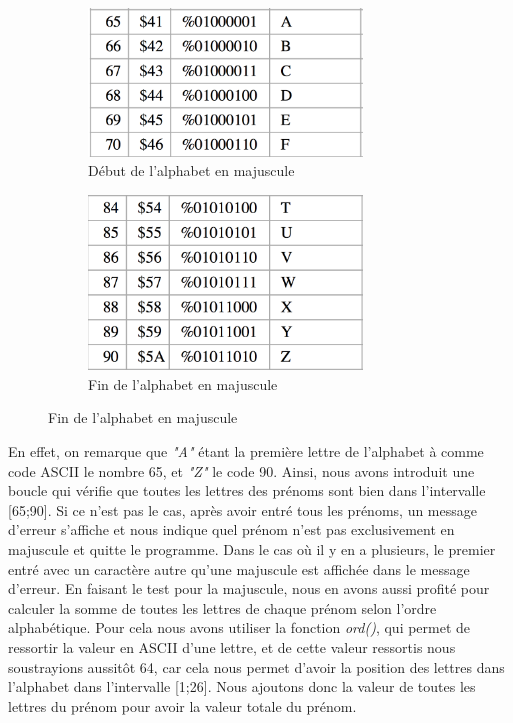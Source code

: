 \documentclass[13pt]{article}
\begin{document}
\begin{figure}[H]
\centering
\begin{subfigure}[H]{.5\textwidth}
  \centering
  \includegraphics[width=0.8\textwidth]{A.png}
  \caption{Début de l'alphabet en majuscule}
\end{subfigure}%
\begin{subfigure}[H]{.5\textwidth}
  \centering
  \includegraphics[width=0.8\textwidth]{Z.png}
  \caption{Fin de l'alphabet en majuscule}
\end{subfigure}
\end{figure}
En effet, on remarque que \emph{"A"} étant la première lettre de l'alphabet à comme code ASCII le nombre 65, et \emph{"Z"} le code 90. Ainsi, nous avons introduit une boucle qui vérifie que toutes les lettres des prénoms sont bien dans l'intervalle [65;90]. Si ce n'est pas le cas, après avoir entré tous les prénoms, un message d'erreur s'affiche et nous indique quel prénom n'est pas exclusivement en majuscule et quitte le programme. Dans le cas où il y en a plusieurs, le premier entré avec un caractère autre qu'une majuscule est affichée dans le message d'erreur. En faisant le test pour la majuscule, nous en avons aussi profité pour calculer la somme de toutes les lettres de chaque prénom selon l'ordre alphabétique. Pour cela nous avons utiliser la fonction \emph{ord()}, qui permet de ressortir la valeur en ASCII d'une lettre, et de cette valeur ressortis nous soustrayions aussitôt 64, car cela nous permet d'avoir la position des lettres dans l'alphabet dans l'intervalle [1;26]. Nous ajoutons donc la valeur de toutes les lettres du prénom pour avoir la valeur totale du prénom. \\
\end{document}

